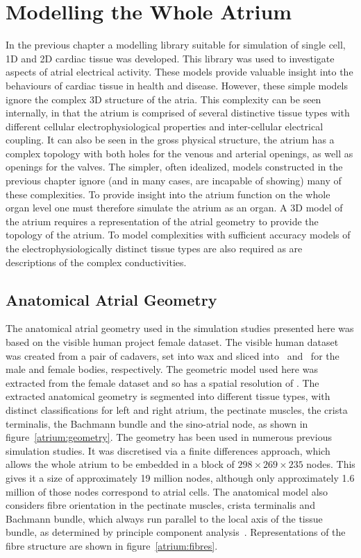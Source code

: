 \chapter{Modelling the Whole Atrium}

In the previous chapter a modelling library suitable for simulation of single
cell, 1D and 2D cardiac tissue was developed.
This library was used to investigate aspects of atrial electrical activity.
These models provide valuable insight into the behaviours of cardiac tissue in health
and disease.
However, these simple models ignore the complex 3D structure of the atria.
This complexity can be seen internally, in that the atrium is comprised of several
distinctive tissue types with different cellular electrophysiological properties
and inter-cellular electrical coupling.
It can also be seen in the gross physical structure, the atrium has a complex
topology with both holes for the venous and arterial openings, as well as
openings for the valves.
The simpler, often idealized, models constructed in the previous chapter
ignore (and in many cases, are incapable of showing) many of these complexities.
To provide insight into the atrium function on the whole organ level one must
therefore simulate the atrium as an organ.
A 3D model of the atrium requires a representation of the atrial geometry to
provide the topology of the atrium.
To model complexities with sufficient accuracy models of the
electrophysiologically distinct tissue types are also required as are
descriptions of the complex conductivities.


\section{Anatomical Atrial Geometry}
\label{atrium:sec:geometry}

The anatomical atrial geometry used in the simulation studies presented here was based on
the visible human project female dataset.
The visible human dataset was created from a pair of cadavers, set into wax and
sliced into \ and \ for the male and female bodies, respectively.
The geometric model used here was extracted from the female dataset and so has a
spatial resolution of .
The extracted anatomical geometry is segmented into different tissue types,
with distinct classifications for left and right atrium, the pectinate muscles,
the crista terminalis, the Bachmann bundle and the sino-atrial node, as shown in
figure~\ref{atrium:geometry}.
The geometry has been used in numerous previous simulation studies.
It was discretised via a finite differences approach, which
allows the whole atrium to be embedded in a block of $298\times269\times235$
nodes.
This gives it a size of approximately 19 million nodes, although only
approximately 1.6 million of those nodes correspond to atrial cells.
The anatomical model also considers fibre orientation in the pectinate muscles,
crista terminalis and Bachmann bundle, which always run parallel to the local
axis of the tissue bundle, as determined by principle component
analysis~\cite{Seemann2006}.
Representations of the fibre structure are shown in figure~\ref{atrium:fibres}.


